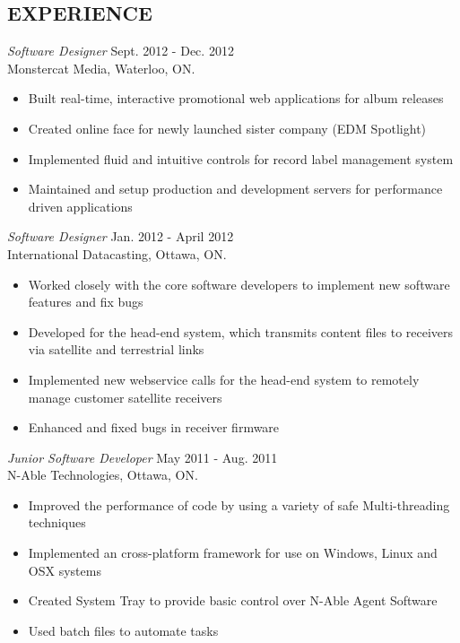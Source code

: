\documentclass[margin]{res}
\begin{document}
\begin{resume}
\section{EXPERIENCE} 
{\sl Software Designer} \hfill Sept. 2012 - Dec. 2012 \\
Monstercat Media, Waterloo, ON.
\begin{itemize}  \itemsep -2pt %
  \item Built real-time, interactive promotional web applications for album releases
  \item Created online face for newly launched sister company (EDM Spotlight)
  \item Implemented fluid and intuitive controls for record label management system
  \item Maintained and setup production and development servers for performance driven applications
\end{itemize}

{\sl Software Designer} \hfill Jan. 2012 - April 2012 \\
International Datacasting, Ottawa, ON.
\begin{itemize}  \itemsep -2pt %
  \item Worked closely with the core software developers to implement new software features and fix bugs
  \item Developed for the head-end system, which transmits content files to receivers via satellite and terrestrial links
  \item Implemented new webservice calls for the head-end system to remotely manage customer satellite receivers
  \item Enhanced and fixed bugs in receiver firmware
\end{itemize}


{\sl Junior Software Developer} \hfill May 2011 - Aug. 2011 \\
N-Able Technologies, Ottawa, ON.
\begin{itemize} \itemsep -2pt
  \item Improved the performance of code by using a variety of safe Multi-threading techniques
  \item Implemented an cross-platform framework for use on Windows, Linux and OSX systems
  \item  Created System Tray to provide basic control over N-Able Agent Software
  \item Used batch files to automate tasks
\end{itemize}


\end{resume}
\end{document}
